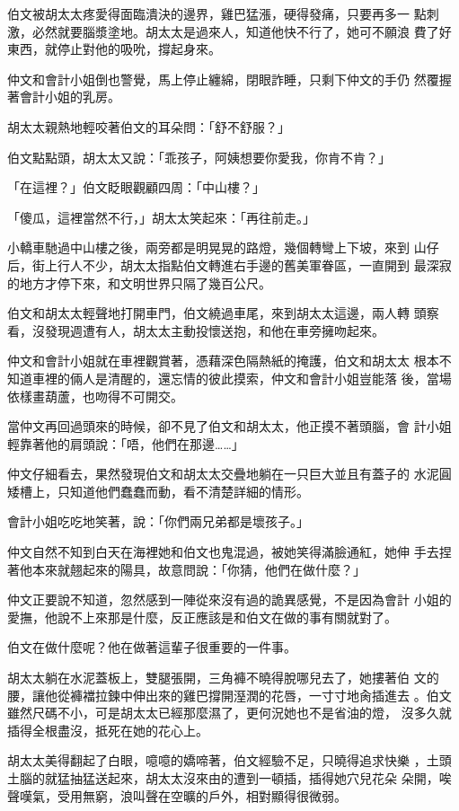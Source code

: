 伯文被胡太太疼愛得面臨潰決的邊界，雞巴猛漲，硬得發痛，只要再多一
點刺激，必然就要腦漿塗地。胡太太是過來人，知道他快不行了，她可不願浪
費了好東西，就停止對他的吸吮，撐起身來。

仲文和會計小姐倒也警覺，馬上停止纏綿，閉眼詐睡，只剩下仲文的手仍
然覆握著會計小姐的乳房。

胡太太親熱地輕咬著伯文的耳朵問：「舒不舒服？」

伯文點點頭，胡太太又說：「乖孩子，阿姨想要你愛我，你肯不肯？」

「在這裡？」伯文眨眼觀顧四周：「中山樓？」

「傻瓜，這裡當然不行，」胡太太笑起來：「再往前走。」

小轎車馳過中山樓之後，兩旁都是明晃晃的路燈，幾個轉彎上下坡，來到
山仔后，街上行人不少，胡太太指點伯文轉進右手邊的舊美軍眷區，一直開到
最深寂的地方才停下來，和文明世界只隔了幾百公尺。

伯文和胡太太輕聲地打開車門，伯文繞過車尾，來到胡太太這邊，兩人轉
頭察看，沒發現週遭有人，胡太太主動投懷送抱，和他在車旁擁吻起來。

仲文和會計小姐就在車裡觀賞著，憑藉深色隔熱紙的掩護，伯文和胡太太
根本不知道車裡的倆人是清醒的，還忘情的彼此摸索，仲文和會計小姐豈能落
後，當場依樣畫葫蘆，也吻得不可開交。

當仲文再回過頭來的時候，卻不見了伯文和胡太太，他正摸不著頭腦，會
計小姐輕靠著他的肩頭說：「唔，他們在那邊……」

仲文仔細看去，果然發現伯文和胡太太交疊地躺在一只巨大並且有蓋子的
水泥圓矮槽上，只知道他們蠢蠢而動，看不清楚詳細的情形。

會計小姐吃吃地笑著，說：「你們兩兄弟都是壞孩子。」

仲文自然不知到白天在海裡她和伯文也鬼混過，被她笑得滿臉通紅，她伸
手去捏著他本來就翹起來的陽具，故意問說：「你猜，他們在做什麼？」

仲文正要說不知道，忽然感到一陣從來沒有過的詭異感覺，不是因為會計
小姐的愛撫，他說不上來那是什麼，反正應該是和伯文在做的事有關就對了。

伯文在做什麼呢？他在做著這輩子很重要的一件事。

胡太太躺在水泥蓋板上，雙腿張開，三角褲不曉得脫哪兒去了，她摟著伯
文的腰，讓他從褲襠拉鍊中伸出來的雞巴撐開溼潤的花唇，一寸寸地肏插進去
。伯文雖然尺碼不小，可是胡太太已經那麼濕了，更何況她也不是省油的燈，
沒多久就插得全根盡沒，抵死在她的花心上。

胡太太美得翻起了白眼，噫噫的嬌啼著，伯文經驗不足，只曉得追求快樂
，土頭土腦的就猛抽猛送起來，胡太太沒來由的遭到一頓插，插得她穴兒花朵
朵開，唉聲嘆氣，受用無窮，浪叫聲在空曠的戶外，相對顯得很微弱。

